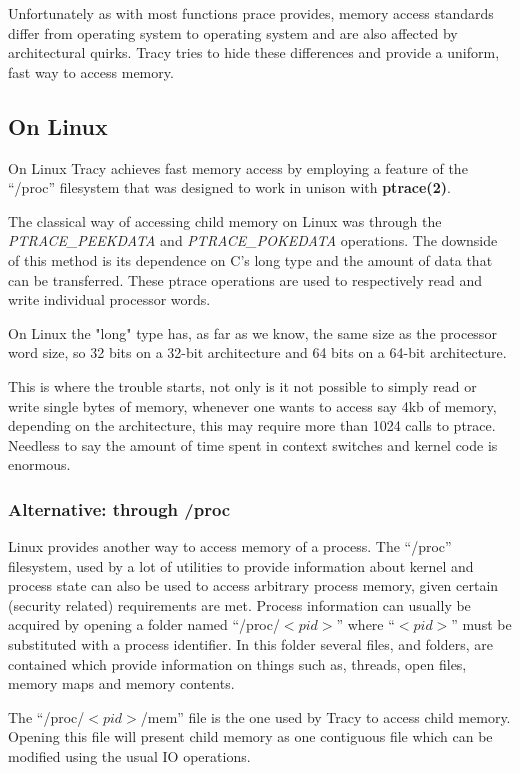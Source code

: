 \documentclass[a4paper, twoside, 10pt, twocolumn]{report}
\begin{document}
Unfortunately as with most functions prace provides, memory access standards
differ from operating system to operating system and are also
affected by architectural quirks. Tracy tries to hide these differences and
provide a uniform, fast way to access memory.

\subsection{On Linux}
On Linux Tracy achieves fast memory access by employing a feature of the
``/proc'' filesystem that was designed to work in unison with
\textbf{ptrace(2)}.

The classical way of accessing child memory on Linux was through the
\textit{PTRACE\_PEEKDATA} and \textit{PTRACE\_POKEDATA} operations.
The downside of this method is its dependence on C's long type and the
amount of data that can be transferred.
These ptrace operations are used to respectively read and write individual
processor words.

On Linux the "long" type has, as far as we know, the same size as the
processor word size, so 32 bits on a 32-bit architecture and
64 bits on a 64-bit architecture.

This is where the trouble starts, not only is it not possible to simply read
or write single bytes of memory, whenever one wants to access say 4kb of
memory, depending on the architecture, this may require more than 1024
calls to ptrace. Needless to say the amount of time spent in context switches
and kernel code is enormous.

\subsubsection{Alternative: through /proc}
Linux provides another way to access memory of a process. The ``/proc''
filesystem, used by a lot of utilities to provide information about kernel
and process state can also be used to access arbitrary process memory,
given certain (security related) requirements are met.
Process information can usually be acquired by opening a folder
named ``/proc/$<pid>$'' where ``$<pid>$'' must be substituted with a process
identifier. In this folder several files, and folders, are contained which
provide information on things such as, threads, open files, memory maps and
memory contents.

The ``/proc/$<pid>$/mem'' file is the one used by Tracy to access child memory.
Opening this file will present child memory as one contiguous file which
can be modified using the usual IO operations.
\end{document}
